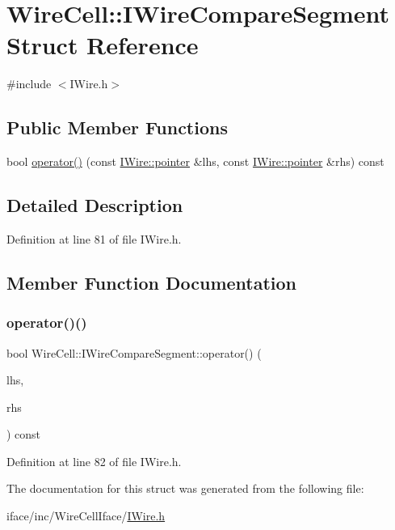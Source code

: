 \hypertarget{struct_wire_cell_1_1_i_wire_compare_segment}{}\section{Wire\+Cell\+:\+:I\+Wire\+Compare\+Segment Struct Reference}
\label{struct_wire_cell_1_1_i_wire_compare_segment}


{\ttfamily \#include $<$I\+Wire.\+h$>$}

\subsection*{Public Member Functions}
\begin{DoxyCompactItemize}
\item 
bool \hyperlink{struct_wire_cell_1_1_i_wire_compare_segment_a6317e373f4f25dad426b7adcda54286a}{operator()} (const \hyperlink{class_wire_cell_1_1_i_data_aff870b3ae8333cf9265941eef62498bc}{I\+Wire\+::pointer} \&lhs, const \hyperlink{class_wire_cell_1_1_i_data_aff870b3ae8333cf9265941eef62498bc}{I\+Wire\+::pointer} \&rhs) const
\end{DoxyCompactItemize}


\subsection{Detailed Description}


Definition at line 81 of file I\+Wire.\+h.



\subsection{Member Function Documentation}
\mbox{\label{struct_wire_cell_1_1_i_wire_compare_segment_a6317e373f4f25dad426b7adcda54286a}} 
\subsubsection{\texorpdfstring{operator()()}{operator()()}}
{\footnotesize\ttfamily bool Wire\+Cell\+::\+I\+Wire\+Compare\+Segment\+::operator() (\begin{DoxyParamCaption}\item[{const \hyperlink{class_wire_cell_1_1_i_data_aff870b3ae8333cf9265941eef62498bc}{I\+Wire\+::pointer} \&}]{lhs,  }\item[{const \hyperlink{class_wire_cell_1_1_i_data_aff870b3ae8333cf9265941eef62498bc}{I\+Wire\+::pointer} \&}]{rhs }\end{DoxyParamCaption}) const\hspace{0.3cm}{\ttfamily [inline]}}



Definition at line 82 of file I\+Wire.\+h.



The documentation for this struct was generated from the following file\+:\begin{DoxyCompactItemize}
\item 
iface/inc/\+Wire\+Cell\+Iface/\hyperlink{_i_wire_8h}{I\+Wire.\+h}\end{DoxyCompactItemize}
